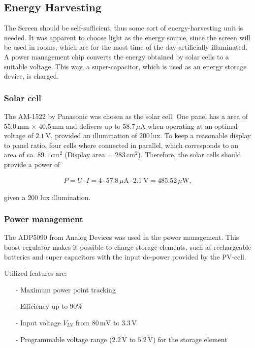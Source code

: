 \subsection{Energy Harvesting}
The Screen should be self-sufficient, thus some sort of energy-harvesting unit is needed.
It was apparent to choose light as the energy source, since the screen will be used in rooms, which are for the most time of the day artificially illuminated.
A power management chip converts the energy  obtained by solar cells to a suitable voltage.
This way, a super-capacitor, which is used as an energy storage device, is charged.

\subsubsection{Solar cell}
The AM-1522 by Panasonic was chosen as the solar cell.
One panel has a area of $55.0\,\text{mm}\,\times\,40.5\,\text{mm}$ and delivers up to $58.7\, \mu\text{A}$ when operating at an optimal voltage of $2.1\,\text{V}$, provided an illumination of 200\,lux.
To keep a reasonable display to panel ratio, four cells where connected in parallel, which corresponds to an area of ca. $89.1\,\text{cm}^2$ (Display area = $283\,\text{cm}^2$). Therefore, the solar cells should provide a power of

\begin{align}
	P = U\cdot I = 4\cdot 57.8\,\mu\text{A}\cdot 2.1\ \text{V}=485.52\,\mu \text{W},\label{development:cell_power}
\end{align}

given a 200 lux illumination. \cite{amorton}

\subsubsection{Power management}
The ADP5090 from Analog Devices was used in the power management.
This boost regulator makes it possible to charge storage elements, such as rechargeable batteries and super capacitors with the input dc-power provided by the PV-cell.

Utilized features are:
\begin{itemize}
	\item[-] Maximum power point tracking
	\item[-] Efficiency up to 90\%
	\item[-] Input voltage $V_{IN}$ from $80\,\text{mV}$ to $3.3\,\text{V}$
	\item[-] Programmable voltage range ($2.2\,\text{V}$ to $5.2\,\text{V}$) for the storage element
\end{itemize}

